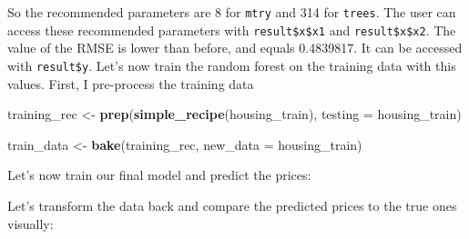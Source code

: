 \documentclass[]{gitbook}
\newenvironment{Shaded}{\begin{snugshade}}{\end{snugshade}}
\newcommand{\DataTypeTok}[1]{\textcolor[rgb]{0.13,0.29,0.53}{#1}}
\newcommand{\KeywordTok}[1]{\textcolor[rgb]{0.13,0.29,0.53}{\textbf{#1}}}
\newcommand{\NormalTok}[1]{#1}
\newcommand{\OperatorTok}[1]{\textcolor[rgb]{0.81,0.36,0.00}{\textbf{#1}}}
\newcommand{\StringTok}[1]{\textcolor[rgb]{0.31,0.60,0.02}{#1}}
\theoremstyle{definition}
\theoremstyle{definition}
\theoremstyle{definition}
\theoremstyle{remark}
\begin{document}
So the recommended parameters are 8 for \texttt{mtry} and 314 for
\texttt{trees}. The user can access these recommended parameters with
\texttt{result\$x\$x1} and \texttt{result\$x\$x2}. The value of the RMSE
is lower than before, and equals 0.4839817. It can be accessed with
\texttt{result\$y}. Let's now train the random forest on the training
data with this values. First, I pre-process the training data

\begin{Shaded}
\begin{Highlighting}[]
\NormalTok{training_rec <-}\StringTok{ }\KeywordTok{prep}\NormalTok{(}\KeywordTok{simple_recipe}\NormalTok{(housing_train), }\DataTypeTok{testing =}\NormalTok{ housing_train)}

\NormalTok{train_data <-}\StringTok{ }\KeywordTok{bake}\NormalTok{(training_rec, }\DataTypeTok{new_data =}\NormalTok{ housing_train)}
\end{Highlighting}
\end{Shaded}

Let's now train our final model and predict the prices:

\begin{Shaded}
\end{Shaded}

Let's transform the data back and compare the predicted prices to the
true ones visually:

\begin{Shaded}
\end{Shaded}
\end{document}
